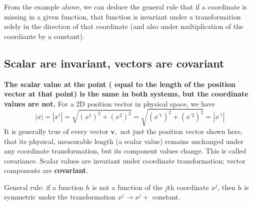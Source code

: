 \begin{qt}
    From the example above, we can deduce the general rule that if a coordinate is missing in a given function, that function is invariant under a transformation solely in the direction of that coordinate (and also under multiplication of the coordiante by a constant).
\end{qt}
\textbf{}
\subsection{Scalar are invariant, vectors are covariant}
\textbf{The scalar value at the point ( equal to the length of the position vector at that point) is the same in both systems, but the coordinate values are not.} For a 2D position vector in physical space, we have
$$
|x|=\left|x^{i}\right|=\sqrt{\left(x^{1}\right)^{2}+\left(x^{2}\right)^{2}}=\sqrt{\left(x^{\prime1}\right)^{2}+\left(x^{\prime2}\right)^{2}}=\left|x^{\prime i}\right|
$$
It is generally true of every vector $\mathbf{v},$ not just the position vector shown here, that its physical, measurable length (a scalar value) remains unchanged under any coordinate transformation, but its component values change. This is called covariance. Scalar values are invariant under coordinate transformation; vector components are \textbf{covariant}.
\begin{qt}
    General rule: if a function $h$ is not a function of the $j$th coordinate $x^j$, then h is symmetric under the transformation $x^{j} \rightarrow x^{j}+$ constant.
\end{qt}
